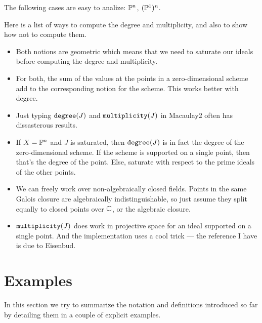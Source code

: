 \documentclass[fleqn,reqno]{amsart}
\numberwithin{first}{chapter}
\begin{document}
\begin{example}
The following cases are easy to analize: $\mathbb{P}^n$, $(\mathbb{P}^1)^n$.
\end{example}

\begin{example}
Here is a list of ways to compute the degree and multiplicity, and also
to show how not to compute them.
\begin{itemize}
	\item Both notions are geometric which means that we need to saturate our ideals
	before computing the degree and multiplicity.
	\item For both, the sum of the values at the points in a zero-dimensional scheme
	add to the corresponding notion for the scheme.
	This works better with degree.
	\item Just typing $\mathop{\tt degree}(J)$ and $\mathop{\tt multiplicity}(J)$ in Macaulay2 often
	has dissasterous results.
	\item If $X=\mathbb{P}^n$ and $J$ is saturated, then $\mathop{\tt degree}(J)$ is in fact the degree
	of the zero-dimensional scheme.
	If the scheme is supported on a single point, then that's the degree of the point.
	Else, saturate with respect to the prime ideals of the other points.
	\item We can freely work over non-algebraically closed fields.
	Points in the same Galois closure are algebraically indistinguishable,
	so just assume they split equally to closed points over $\mathbb{C}$, or the algebraic closure.
	\item $\mathop{\tt multiplicity}(J)$ does work in projective space for an ideal supported
	on a single point.
	And the implementation uses a cool trick --- the reference I have is due to Eisenbud.
\end{itemize}
\end{example}

\section{Examples}

In this section we try to summarize the notation and definitions introduced so far
by detailing them in a couple of explicit examples.
\end{document}
